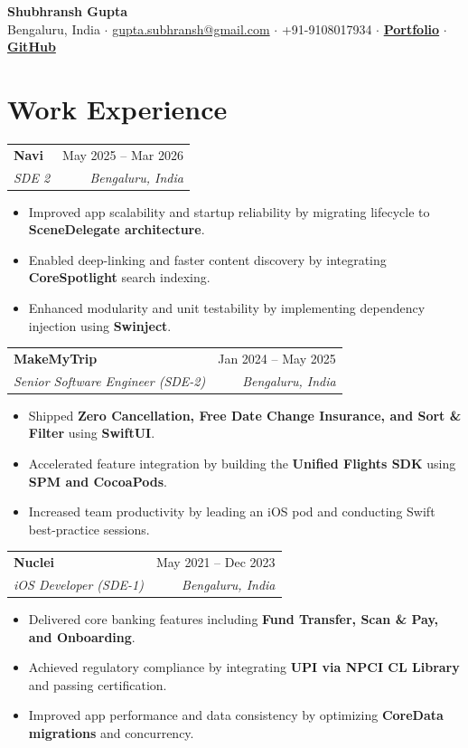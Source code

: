 \documentclass[a4paper,10pt]{article}
\makeatletter
\newcommand{\resumeSubheading}[4]{
  \vspace{4pt}
  \begin{tabular*}{\textwidth}{l@{\extracolsep{\fill}}r}
    \textbf{#1} & \small #2 \\
    \textit{\small #3} & \textit{\small #4} \\
  \end{tabular*}
  \vspace{-5pt}
}
\newcommand{\resumeItemListStart}{\begin{itemize}[leftmargin=0.16in, itemsep=1.8pt, topsep=2.5pt, parsep=0pt]\small}
\newcommand{\resumeItemListEnd}{\end{itemize}\vspace{-2pt}}
\makeatother
\begin{document}
\begin{center}
    {\Huge \textbf{Shubhransh Gupta}} \\[4pt]
    {\small
    \faMapMarker*\enspace Bengaluru, India \quad $\cdot$ \quad
    \href{mailto:gupta.subhransh@gmail.com}{\faEnvelope\enspace gupta.subhransh@gmail.com} \quad $\cdot$ \quad
    \faPhone*\enspace +91-9108017934 \quad $\cdot$ \quad
    \href{https://shubhransh.is-a.dev}{\faGlobe\enspace \textbf{Portfolio}} \quad $\cdot$ \quad
    \href{https://github.com/shubhransh-gupta}{\faGithub\enspace \textbf{GitHub}}
    }
\end{center}
\vspace{-6pt}

\section{Work Experience}

\resumeSubheading
{Navi}{May 2025 -- Mar 2026}
{SDE 2}{Bengaluru, India}
\resumeItemListStart
\item Improved app scalability and startup reliability by migrating lifecycle to \textbf{SceneDelegate architecture}.
\item Enabled deep-linking and faster content discovery by integrating \textbf{CoreSpotlight} search indexing.
\item Enhanced modularity and unit testability by implementing dependency injection using \textbf{Swinject}.
\resumeItemListEnd

\resumeSubheading
{MakeMyTrip}{Jan 2024 -- May 2025}
{Senior Software Engineer (SDE-2)}{Bengaluru, India}
\resumeItemListStart
\item Shipped \textbf{Zero Cancellation, Free Date Change Insurance, and Sort \& Filter} using \textbf{SwiftUI}.
\item Accelerated feature integration by building the \textbf{Unified Flights SDK} using \textbf{SPM and CocoaPods}.
\item Increased team productivity by leading an iOS pod and conducting Swift best-practice sessions.
\resumeItemListEnd

\resumeSubheading
{Nuclei}{May 2021 -- Dec 2023}
{iOS Developer (SDE-1)}{Bengaluru, India}
\resumeItemListStart
\item Delivered core banking features including \textbf{Fund Transfer, Scan \& Pay, and Onboarding}.
\item Achieved regulatory compliance by integrating \textbf{UPI via NPCI CL Library} and passing certification.
\item Improved app performance and data consistency by optimizing \textbf{CoreData migrations} and concurrency.
\resumeItemListEnd
\end{document}

